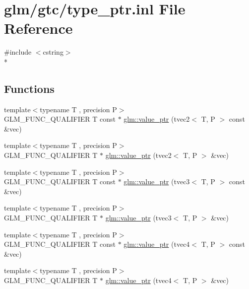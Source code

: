 \hypertarget{type__ptr_8inl}{\section{glm/gtc/type\-\_\-ptr.inl File Reference}
\label{type__ptr_8inl}
}
{\ttfamily \#include $<$cstring$>$}\\*
\subsection*{Functions}
\begin{DoxyCompactItemize}
\item 
{\footnotesize template$<$typename T , precision P$>$ }\\G\-L\-M\-\_\-\-F\-U\-N\-C\-\_\-\-Q\-U\-A\-L\-I\-F\-I\-E\-R T const $\ast$ \hyperlink{group__gtc__type__ptr_gafb01331238d8899dde700cb9b5dc6ef3}{glm\-::value\-\_\-ptr} (tvec2$<$ T, P $>$ const \&vec)
\item 
{\footnotesize template$<$typename T , precision P$>$ }\\G\-L\-M\-\_\-\-F\-U\-N\-C\-\_\-\-Q\-U\-A\-L\-I\-F\-I\-E\-R T $\ast$ \hyperlink{group__gtc__type__ptr_gabd3cc713184a2093862605f5f0abb8a4}{glm\-::value\-\_\-ptr} (tvec2$<$ T, P $>$ \&vec)
\item 
{\footnotesize template$<$typename T , precision P$>$ }\\G\-L\-M\-\_\-\-F\-U\-N\-C\-\_\-\-Q\-U\-A\-L\-I\-F\-I\-E\-R T const $\ast$ \hyperlink{group__gtc__type__ptr_gac04db5d9c05bd3d50140f34f8695a08c}{glm\-::value\-\_\-ptr} (tvec3$<$ T, P $>$ const \&vec)
\item 
{\footnotesize template$<$typename T , precision P$>$ }\\G\-L\-M\-\_\-\-F\-U\-N\-C\-\_\-\-Q\-U\-A\-L\-I\-F\-I\-E\-R T $\ast$ \hyperlink{group__gtc__type__ptr_gab2832ef9f1d2571fab5c7ae661e11e75}{glm\-::value\-\_\-ptr} (tvec3$<$ T, P $>$ \&vec)
\item 
{\footnotesize template$<$typename T , precision P$>$ }\\G\-L\-M\-\_\-\-F\-U\-N\-C\-\_\-\-Q\-U\-A\-L\-I\-F\-I\-E\-R T const $\ast$ \hyperlink{group__gtc__type__ptr_gaf641bc0e28d4b274826b9afed315d310}{glm\-::value\-\_\-ptr} (tvec4$<$ T, P $>$ const \&vec)
\item 
{\footnotesize template$<$typename T , precision P$>$ }\\G\-L\-M\-\_\-\-F\-U\-N\-C\-\_\-\-Q\-U\-A\-L\-I\-F\-I\-E\-R T $\ast$ \hyperlink{group__gtc__type__ptr_ga4c19763f3c5991b9dc88a3ffdd9ea6cd}{glm\-::value\-\_\-ptr} (tvec4$<$ T, P $>$ \&vec)

\end{DoxyCompactItemize}
